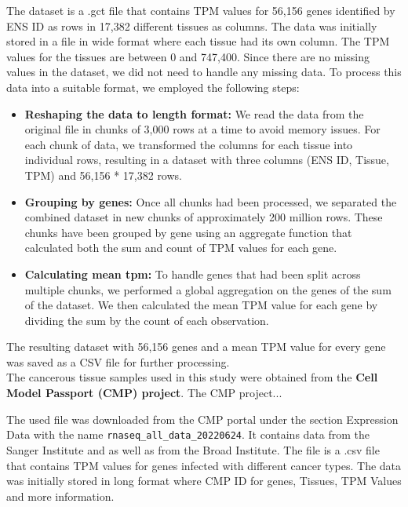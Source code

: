 The dataset is a .gct file that contains TPM values for 56,156 genes identified by ENS ID as rows in 17,382 different tissues as columns.
The data was initially stored in a file in wide format where each tissue had its own column.
The TPM values for the tissues are between 0 and 747,400.
Since there are no missing values in the dataset, we did not need to handle any missing data.
To process this data into a suitable format, we employed the following steps:
\begin{itemize}
    \item \textbf{Reshaping the data to length format:} We read the data from the original file in chunks of 3,000 rows at a time to avoid memory issues.
    For each chunk of data, we transformed the columns for each tissue into individual rows,
    resulting in a dataset with three columns (ENS ID, Tissue, TPM) and 56,156 * 17,382 rows.
    \item \textbf{Grouping by genes:} Once all chunks had been processed, we separated the combined dataset in new chunks of approximately 200 million rows.
    These chunks have been grouped by gene using an aggregate function that calculated both the sum and count of TPM values for each gene.
    \item \textbf{Calculating mean tpm:} To handle genes that had been split across multiple chunks,
    we performed a global aggregation on the genes of the sum of the dataset.
    We then calculated the mean TPM value for each gene by dividing the sum by the count of each observation.
\end{itemize}
The resulting dataset with 56,156 genes and a mean TPM value for every gene was saved as a CSV file for further processing.
\\


The cancerous tissue samples used in this study were obtained from the \textbf{Cell Model Passport (CMP) project}.
The CMP project...

The used file was downloaded from the CMP portal \cite{cmp_download} under the section Expression Data
with the name \texttt{rnaseq\_all\_data\_20220624}.
It contains data from the Sanger Institute and as well as from the Broad Institute.
The file is a .csv file that contains TPM values for genes infected with different cancer types.
The data was initially stored in long format where CMP ID for genes, Tissues, TPM Values and more information.



